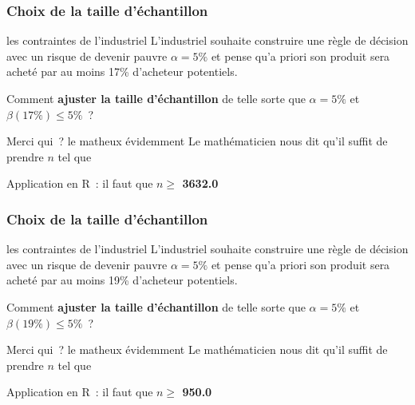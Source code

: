 \documentclass[11pt]{beamer}
\begin{document}
\begin{frame}
\frametitle{Choix de la taille d'échantillon}

\begin{block}{les contraintes de l'industriel}
L'industriel souhaite construire une règle de décision avec un risque de devenir pauvre $\alpha=5\%$ et pense qu'a priori son produit sera acheté par au moins 17\% d'acheteur potentiels. \pause

Comment \textbf{ajuster la taille d'échantillon} de telle sorte que $\alpha=5\%$ et $\beta(17\%)\leq 5\%$~?
\end{block}
\pause 
\begin{alertblock}{Merci qui~? le matheux évidemment }
Le mathématicien nous dit qu'il suffit de prendre $n$ tel que \\
\centerline{}

\pause  Application en R~: il faut que \textbf{$n\geq$ 3632.0 }  
\end{alertblock}

\end{frame}

\begin{frame}
\frametitle{Choix de la taille d'échantillon}

\begin{block}{les contraintes de l'industriel}
L'industriel souhaite construire une règle de décision avec un risque de devenir pauvre $\alpha=5\%$ et pense qu'a priori son produit sera acheté par au moins 19\% d'acheteur potentiels. \pause

Comment \textbf{ajuster la taille d'échantillon} de telle sorte que $\alpha=5\%$ et $\beta(19\%)\leq 5\%$~?
\end{block}
\pause 
\begin{alertblock}{Merci qui~? le matheux évidemment }
Le mathématicien nous dit qu'il suffit de prendre $n$ tel que \\
\centerline{}

\pause  Application en R~: il faut que \textbf{$n\geq$ 950.0 }  
\end{alertblock}

\end{frame}
\end{document}
